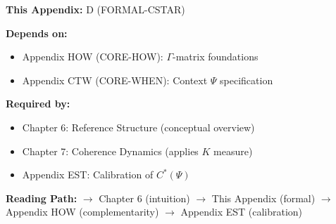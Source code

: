 \begin{tcolorbox}[colback=gray!10!white, colframe=gray!75!black,
    title=\textbf{Cross-Reference Footer}]

\textbf{This Appendix:} D (FORMAL-CSTAR)

\textbf{Depends on:}
\begin{itemize}[nosep]
    \item Appendix HOW (CORE-HOW): $\Gamma$-matrix foundations
    \item Appendix CTW (CORE-WHEN): Context $\Psi$ specification
\end{itemize}

\textbf{Required by:}
\begin{itemize}[nosep]
    \item Chapter 6: Reference Structure (conceptual overview)
    \item Chapter 7: Coherence Dynamics (applies $K$ measure)
    \item Appendix EST: Calibration of $C^*(\Psi)$
\end{itemize}

\textbf{Reading Path:}
$\rightarrow$ Chapter 6 (intuition) $\rightarrow$ This Appendix (formal)
$\rightarrow$ Appendix HOW (complementarity) $\rightarrow$ Appendix EST (calibration)

\end{tcolorbox}

